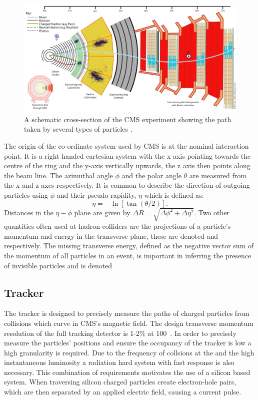 \begin{figure}
  \includegraphics[width=1.2\largefigwidth]{plots/detector/CMS_Slice.png}
  \caption{A schematic cross-section of the CMS experiment showing the path taken by several types of particles \cite{CMSSlice}.}
  \label{fig:cmsschematic2}
\end{figure}

The origin of the co-ordinate system used by CMS is at the nominal interaction point. It is a right handed cartesian system with the x axis pointing towards the centre of the \LHC ring and the y-axis vertically upwards, the z axis then points along the beam line. The azimuthal angle $\phi$ and the polar angle $\theta$ are measured from the x and z axes respectively. It is common to describe the direction of outgoing particles using $\phi$ and their pseudo-rapidity, $\eta$ which is defined as:
\begin{equation}
  \label{eq:eta}
  \eta=-\ln[\tan(\theta/2)].
\end{equation}
Distances in the $\eta-\phi$ plane are given by $\Delta R=\sqrt{\Delta\phi^2+\Delta\eta^2}$. Two other quantities often used at hadron colliders are the projections of a particle's momentum and energy in the transverse plane, these are denoted \pt and \Et respectively. The missing transverse energy, defined as the negative vector sum of the momentum of all particles in an event, is important in inferring the presence of invisible particles and is denoted \MET

\subsection{Tracker}
\label{sec:tracker}
The tracker is designed to precisely measure the paths of charged particles from \LHC collisions which curve in CMS's magnetic field. The design transverse momentum resolution of the full tracking detector is 1-2\% at 100\GeV~. In order to precisely measure the particles' positions and ensure the occupancy of the tracker is low a high granularity is required. Due to the frequency of collsions at the \LHC and the high instantaneous luminosity a radiation hard system with fast response is also necessary. This combination of requirements motivates the use of a silicon based system. When traversing silicon charged particles create electron-hole pairs, which are then separated by an applied electric field, causing a current pulse.

